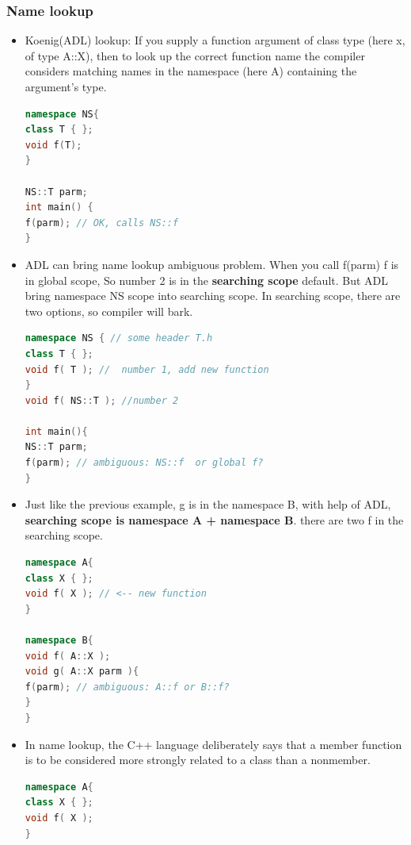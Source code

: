 \documentclass[a4paper,12pt,twoside]{book}
\begin{document}
\subsubsection{Name lookup}
\begin{itemize}

\item Koenig(ADL) lookup: If you supply a function argument of class type (here x, of type A::X), then to look up the correct function name the compiler considers matching names in the namespace (here A) containing the argument's type.

\begin{lstlisting}[frame=single, language=c++]
namespace NS{
class T { };
void f(T);
}

NS::T parm;
int main() {
f(parm); // OK, calls NS::f
}
\end{lstlisting}

\item ADL can bring name lookup ambiguous problem.  When you call f(parm) f is in global scope, So number 2 is in the \textbf{searching scope} default. But ADL bring namespace NS scope into searching scope. In searching scope, there are two options, so compiler will bark.

\begin{lstlisting}[frame=single, language=c++]
namespace NS { // some header T.h
class T { };
void f( T ); //  number 1, add new function
}
void f( NS::T ); //number 2

int main(){
NS::T parm;
f(parm); // ambiguous: NS::f  or global f?
}
\end{lstlisting}

\item Just like the previous example, g is in the namespace B, with help of ADL, \textbf{searching scope is namespace A + namespace B}. there are two f in the searching scope.

\begin{lstlisting}[frame=single, language=c++]
namespace A{
class X { };
void f( X ); // <-- new function
}

namespace B{
void f( A::X );
void g( A::X parm ){
f(parm); // ambiguous: A::f or B::f?
}
}
\end{lstlisting}

\item In name lookup, the C++ language deliberately says that a member function is to be considered more strongly related to a class than a nonmember.
\begin{lstlisting}[frame=single, language=c++]
namespace A{
class X { };
void f( X );
}


\end{lstlisting}
\end{itemize}
\end{document}
